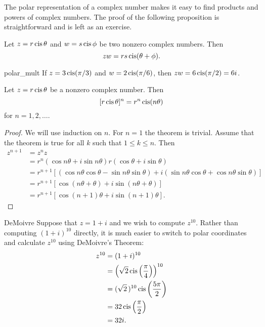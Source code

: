  
The polar representation of a complex number makes it easy to find
products and powers of complex numbers.  The proof of the following
proposition is straightforward and is left as an exercise.
 
 
\begin{proposition}\label{polar_mult}
Let $z = r \operatorname{cis} \theta$ and $w = s \operatorname{cis} \phi$
be two nonzero complex numbers. Then 
\[
zw = r s \operatorname{cis}( \theta + \phi).
\]
\end{proposition}
 
 
\begin{example}{polar_mult}
If $z =  3 \operatorname{cis}( \pi / 3 )$ and $w = 2 \operatorname{cis}(\pi / 6 )$, then $zw = 6
\operatorname{cis}( \pi / 2 ) = 6i$.  
\end{example}
 
 
\begin{theorem}[DeMoivre]
Let $z = r \operatorname{cis}  \theta$ be a nonzero complex number. Then 
\[
[r \operatorname{cis} \theta  ]^n
=
r^n \operatorname{cis}( n \theta)
\]
for $n = 1, 2, \ldots$.
\end{theorem}
 
 
\begin{proof}
We will use induction on $n$. For $n = 1$ the theorem is trivial.
Assume that the theorem is true for all $k$ such that $1  \leq k \leq
n$. Then 
\begin{align*}
z^{n+1} & = z^n z \\
& =
r^n( \cos  n \theta + i \sin n \theta ) r( \cos \theta + i
\sin \theta ) \\
& =
r^{n+1} [( \cos n \theta \cos \theta - \sin n \theta \sin
\theta )
 + i ( \sin n \theta \cos \theta + \cos n \theta \sin \theta
)] \\
& =
r^{n+1} [ \cos( n \theta + \theta) + i \sin( n \theta +
\theta) ] \\
& =
r^{n+1} [ \cos( n +1) \theta + i \sin( n+1) \theta  ].
\end{align*}
\end{proof}
 
 
\begin{example}{DeMoivre}
Suppose that $z= 1+i$ and we wish to compute $z^{10}$. Rather than
computing $(1+i)^{10}$ directly, it is much easier to switch to polar
coordinates and calculate $z^{10}$ using DeMoivre's Theorem:
\begin{align*}
z^{10}
& =
(1+i)^{10} \\
& =
\left( \sqrt{2} \operatorname{cis} \left( \frac{\pi }{4} \right)
\right)^{10} \\
& =
( \sqrt{2}\, )^{10} \operatorname{cis} \left( \frac{5\pi }{2} \right)
\\
& =
32  \operatorname{cis} \left( \frac{\pi }{2} \right) \\
& = 32i.
\end{align*}
\end{example}
 

